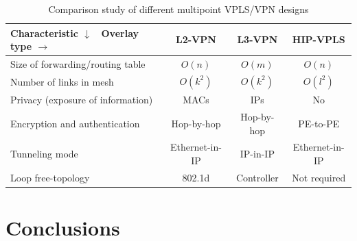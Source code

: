 \begin{table}
    \small
    \begin{tabular}{|l|c|c|c|}
    \hline
    Characteristic $\downarrow$ \ Overlay type $\rightarrow$ & L2-VPN & L3-VPN & HIP-VPLS \\\hline
    Size of forwarding/routing table & $O(n)$ & $O(m)$ & $O(n)$\\\hline
    Number of links in mesh & $O(k^2)$ & $O(k^2)$ & $O(l^2)$ \\\hline
    Privacy (exposure of information) & MACs & IPs & No \\\hline
    Encryption and authentication & Hop-by-hop & Hop-by-hop & PE-to-PE \\\hline
    Tunneling mode & Ethernet-in-IP & IP-in-IP & Ethernet-in-IP \\\hline
    Loop free-topology & 802.1d & Controller & Not required \\\hline
    \end{tabular}
    \label{tab:analysis}
    \caption {Comparison study of different multipoint VPLS/VPN designs}
\end{table}

\chapter{Conclusions}






